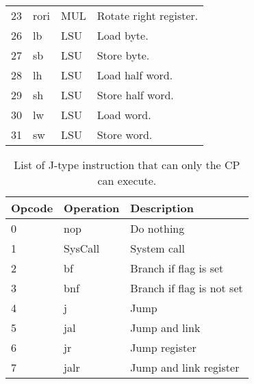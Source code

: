 \begin{table}[h]
\begin{center}
\begin{tabular}{@{}p{}p{}p{}p{}@{}}
23 & rori & MUL	& Rotate right register. \\ 
26 & lb & LSU		& Load byte. \\ 
27 & sb & LSU		& Store byte. \\ 
28 & lh & LSU		& Load half word. \\ 
29 & sh & LSU		& Store half word. \\ 
30 & lw & LSU		& Load word. \\ 
31 & sw & LSU	& Store word. \\ 
\bottomrule
\end{tabular}
\end{center}
\label{table:i_ops}
\end{table}%

\begin{table}[h]
\caption{List of J-type instruction that can only the CP can execute.}
\begin{center}
\begin{tabular}{@{}p{}p{}p{}@{}}
\toprule
\textbf{Opcode} & \textbf{Operation} & \textbf{Description}\\ \hline
0 & nop & Do nothing \\ 
1 & SysCall & System call \\ 
2 & bf & Branch if flag is set \\ 
3 & bnf & Branch if flag is not set \\ 
4 & j & Jump \\ 
5 & jal & Jump and link \\ 
6 & jr & Jump register \\ 
7 & jalr & Jump and link register \\ 
\bottomrule
\end{tabular}
\end{center}
\label{table:j_ops}
\end{table}%